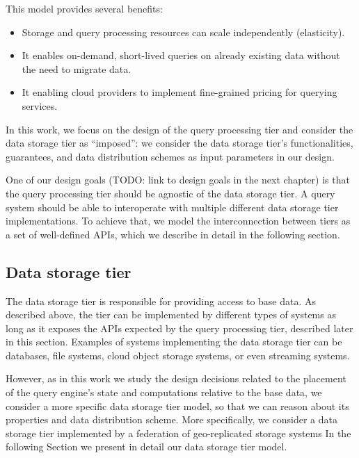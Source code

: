 This model provides several benefits:
\begin{itemize}
  \item Storage and query processing resources can scale independently (elasticity).
  \item It enables on-demand, short-lived queries on already existing data without the need to migrate data.
  \item It enabling cloud providers to implement fine-grained pricing for querying services.
\end{itemize}

In this work, we focus on the design of the query processing tier and consider the data storage tier as ``imposed'':
we consider the data storage tier's functionalities, guarantees, and data distribution schemes as input parameters in
our design.

One of our design goals
(TODO: link to design goals in the next chapter)
is that the query processing tier should be agnostic of the data storage tier.
A query system should be able to interoperate with multiple different data storage tier implementations.
To achieve that, we model the interconnection between tiers as a set of well-defined APIs, which we describe
in detail in the following section.

\subsection{Data storage tier}
The data storage tier is responsible for providing access to base data.
As described above, the tier can be implemented by different types of systems as long as it exposes the APIs expected by
the query processing tier, described later in this section.
Examples of systems implementing the data storage tier can be databases, file systems, cloud object storage systems,
or even streaming systems.

However, as in this work we study the design decisions related to the placement of the query engine's state and
computations relative to the base data, we consider a more specific data storage tier model, so that we can reason about
its properties and data distribution scheme.
More specifically, we consider a data storage tier implemented by a federation of geo-replicated storage systems
In the following Section we present in detail our data storage tier model.

